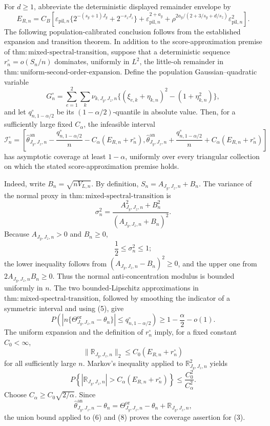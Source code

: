 For \(d\ge1\), abbreviate the deterministic displayed remainder envelope by
\[
E_{R,n}=C_B\left[
\varepsilon_{\mathrm{pil},n}\{2^{-(s_y+1)J_y}+2^{-s_zJ_z}\}
+\varepsilon_{\mathrm{pil},n}^{2+a_y}
+\rho^{2a_y/(2+3/s_y+d/s_z)}\varepsilon_{\mathrm{pil},n}^2
\right].                                                     \tag{1}
\]
The following population-calibrated conclusion follows from the established expansion and transition theorem.  In addition to the score-approximation premise of \(\mathrm{thm{:}mixed\text{-}spectral\text{-}transition}\), suppose that a deterministic sequence \(r_n^\circ=o(S_n/n)\) dominates, uniformly in \(L^2\), the little-oh remainder in \(\mathrm{thm{:}uniform\text{-}second\text{-}order\text{-}expansion}\).  Define the population Gaussian--quadratic variable
\[
G_n^\circ=\sum_{e=1}^2\sum_k\nu_{k,J_y,J_z,n}
\{(\xi_{e,k}+\eta_{k,n})^2-(1+\eta_{k,n}^2)\},               \tag{2}
\]
and let \(q_{n,1-\alpha/2}^\circ\) be its \((1-\alpha/2)\)-quantile in absolute value.  Then, for a sufficiently large fixed \(C_\alpha\), the infeasible interval
\[
\mathcal I_n^\circ=
\left[
\widehat\theta^{\mathrm{an}}_{J_y,J_z,n}
-\frac{q_{n,1-\alpha/2}^\circ}{n}-C_\alpha(E_{R,n}+r_n^\circ),
\widehat\theta^{\mathrm{an}}_{J_y,J_z,n}
+\frac{q_{n,1-\alpha/2}^\circ}{n}+C_\alpha(E_{R,n}+r_n^\circ)
\right]                                                       \tag{3}
\]
has asymptotic coverage at least \(1-\alpha\), uniformly over every triangular collection on which the stated score-approximation premise holds.

Indeed, write \(B_n=\sqrt{nV_{L,n}}\).  By definition, \(S_n=A_{J_y,J_z,n}+B_n\).  The variance of the normal proxy in \(\mathrm{thm{:}mixed\text{-}spectral\text{-}transition}\) is
\[
\sigma_n^2=\frac{A_{J_y,J_z,n}^2+B_n^2}
{(A_{J_y,J_z,n}+B_n)^2}.                                      \tag{4}
\]
Because \(A_{J_y,J_z,n}>0\) and \(B_n\ge0\),
\[
\frac12\le\sigma_n^2\le1;                                   \tag{5}
\]
the lower inequality follows from \((A_{J_y,J_z,n}-B_n)^2\ge0\), and the upper one from \(2A_{J_y,J_z,n}B_n\ge0\).  Thus the normal anti-concentration modulus is bounded uniformly in \(n\).  The two bounded-Lipschitz approximations in \(\mathrm{thm{:}mixed\text{-}spectral\text{-}transition}\), followed by smoothing the indicator of a symmetric interval and using (5), give
\[
P\left(
\left|n\{\Theta^{\mathrm{or}}_{J_y,J_z,n}-\theta_n\}\right|
\le q_{n,1-\alpha/2}^\circ
\right)\ge1-\frac\alpha2-o(1).                                \tag{6}
\]
The uniform expansion and the definition of \(r_n^\circ\) imply, for a fixed constant \(C_0<\infty\),
\[
\|\mathbb R_{J_y,J_z,n}\|_2
\le C_0(E_{R,n}+r_n^\circ)                                    \tag{7}
\]
for all sufficiently large \(n\).  Markov's inequality applied to \(\mathbb R_{J_y,J_z,n}^2\) yields
\[
P\left\{
|\mathbb R_{J_y,J_z,n}|>
C_\alpha(E_{R,n}+r_n^\circ)
\right\}
\le \frac{C_0^2}{C_\alpha^2}.                                \tag{8}
\]
Choose \(C_\alpha\ge C_0\sqrt{2/\alpha}\).  Since
\[
\widehat\theta^{\mathrm{an}}_{J_y,J_z,n}-\theta_n
=\Theta^{\mathrm{or}}_{J_y,J_z,n}-\theta_n
+\mathbb R_{J_y,J_z,n},                                      \tag{9}
\]
the union bound applied to (6) and (8) proves the coverage assertion for (3).

